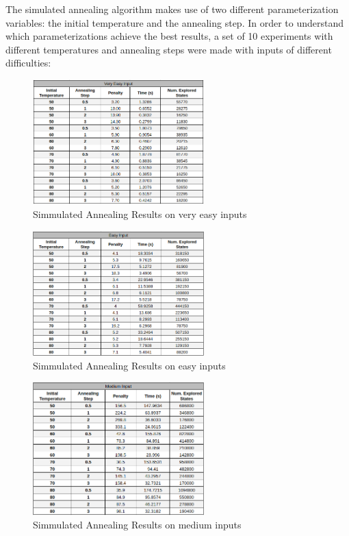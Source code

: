 \documentclass[conference]{IEEEtran}
\begin{document}
The simulated annealing algorithm makes use of two different parameterization variables: the initial temperature and the annealing step. In order to understand which parameterizations achieve the best results, a set of 10 experiments with different temperatures and annealing steps were made with inputs of different difficulties:

\begin{figure}[H]
    \centerline{\includegraphics[width=250px]{annealing_very_easy.png}}
    \caption{Simmulated Annealing Results on very easy inputs}
\end{figure}

\begin{figure}[H]
    \centerline{\includegraphics[width=250px]{annealing_easy.png}}
    \caption{Simmulated Annealing Results on easy inputs}
\end{figure}

\begin{figure}[H]
    \centerline{\includegraphics[width=250px]{annealing_medium.png}}
    \caption{Simmulated Annealing Results on medium inputs}
\end{figure}
\end{document}
